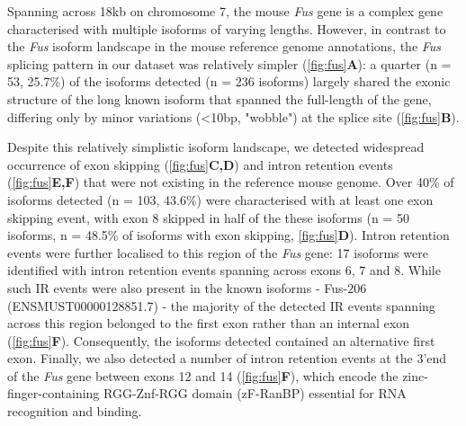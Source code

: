 Spanning across 18kb on chromosome 7, the mouse \textit{Fus} gene is a complex gene characterised with multiple isoforms of varying lengths. However, in contrast to the \textit{Fus} isoform landscape in the mouse reference genome annotations, the \textit{Fus} splicing pattern in our dataset was relatively simpler (\cref{fig:fus}\textbf{A}): a quarter (n = 53, 25.7\%) of the isoforms detected (n = 236 isoforms) largely shared the exonic structure of the long known isoform that spanned the full-length of the gene, differing only by minor variations (<10bp, "wobble") at the splice site (\cref{fig:fus}\textbf{B}). 

Despite this relatively simplistic isoform landscape, we detected widespread occurrence of exon skipping (\cref{fig:fus}\textbf{C,D}) and intron retention events (\cref{fig:fus}\textbf{E,F}) that were not existing in the reference mouse genome. Over 40\% of isoforms detected (n = 103, 43.6\%) were characterised with at least one exon skipping event, with exon 8 skipped in half of the these isoforms (n = 50 isoforms, n = 48.5\% of isoforms with exon skipping, \cref{fig:fus}\textbf{D}). Intron retention events were further localised to this region of the \textit{Fus} gene: 17 isoforms were identified with intron retention events spanning across exons 6, 7 and 8. While such IR events were also present in the known isoforms - Fus-206 (ENSMUST00000128851.7) - the majority of the detected IR events spanning across this region belonged to the first exon rather than an internal exon (\cref{fig:fus}\textbf{F}). Consequently, the isoforms detected contained an alternative first exon. Finally, we also detected a number of intron retention events at the 3'end of the \textit{Fus} gene between exons 12 and 14 (\cref{fig:fus}\textbf{F}), which encode the zinc-finger-containing RGG-Znf-RGG domain (zF-RanBP) essential for RNA recognition and binding\cite{Wang2015c}. 

